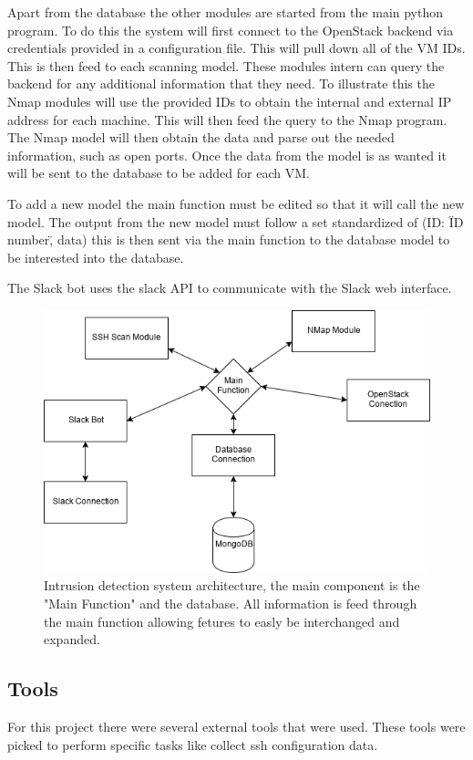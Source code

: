 \documentclass[12pt]{article}
\begin{document}
Apart from the database the other modules are started from the main python program. To do this the system will first connect to the OpenStack backend via credentials provided in a configuration file. This will pull down all of the VM IDs. This is then feed to each scanning model. These modules intern can query the backend for any additional information that they need. To illustrate this the Nmap modules will use the provided IDs to obtain the internal and external IP address for each machine. This will then feed the query to the Nmap program. The Nmap model will then obtain the data and parse out the needed information, such as open ports. Once the data from the model is as wanted it will be sent to the database to be added for each VM.

To add a new model the main function must be edited so that it will call the new model. The output from the new model must follow a set standardized of (ID: \"ID number\", data) this is then sent via the main function to the database model to be interested into the database.

The Slack bot uses the slack API to communicate with the Slack web interface.

\begin{figure}[ht]
    \includegraphics[scale=.7]{./pic/Arcitecture.png}
    \caption{Intrusion detection system architecture, the main component is the "Main Function" and the database. All information is feed through the main function allowing fetures to easly be interchanged and expanded.}
\end{figure}

\newpage

\subsection{Tools}
For this project there were several external tools that were used. These tools were picked to perform specific tasks like collect ssh configuration data.
\end{document}
